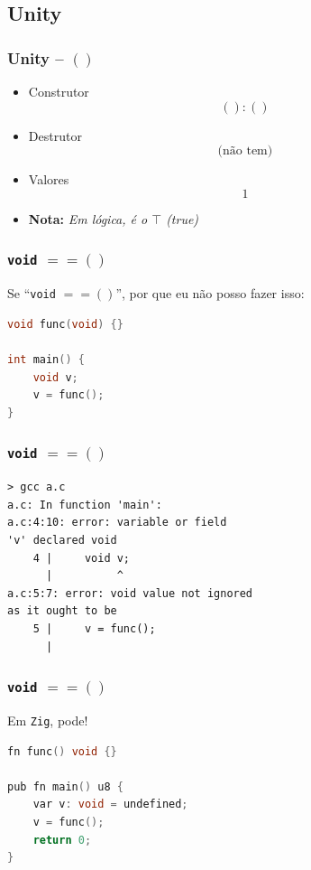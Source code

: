\documentclass{beamer}
\newcommand{\lang}[1]{\texttt{#1}}
\newcommand{\inlcode}[1]{\texttt{#1}}
\newcommand{\nota}[1]{\textbf{Nota:}\textit{ #1}}
\begin{document}
\subsection{Unity}
\begin{frame}
    \frametitle{Unity -- \(()\)}
    \begin{itemize}
        \item Construtor
            \[
                () : ()
            \]
            \vfill
        \item Destrutor
            \[
                \text{(não tem)}
            \]
            \vfill
        \item Valores
            \[
                1
            \]
            \vfill
        \item \nota{Em lógica, é o \(\top\) \emph{(true)}}
    \end{itemize}
\end{frame}

\begin{frame}[fragile]
    \frametitle{\inlcode{void} \(== ()\)}
    Se ``\inlcode{void} \(== ()\)'',
    por que eu não posso fazer isso:
    \vfill
    \begin{lstlisting}[language=C]
void func(void) {}

int main() {
    void v;
    v = func();
}
    \end{lstlisting}
\end{frame}

\begin{frame}[fragile]
    \frametitle{\inlcode{void} \(== ()\)}
    \begin{lstlisting}
> gcc a.c
a.c: In function 'main':
a.c:4:10: error: variable or field
'v' declared void
    4 |     void v;
      |          ^
a.c:5:7: error: void value not ignored
as it ought to be
    5 |     v = func();
      |
    \end{lstlisting}
\end{frame}

\begin{frame}[fragile]
    \frametitle{\inlcode{void} \(== ()\)}
    Em \lang{Zig}, pode!
    \vfill
    \begin{lstlisting}[language=C]
fn func() void {}

pub fn main() u8 {
    var v: void = undefined;
    v = func();
    return 0;
}
    \end{lstlisting}
\end{frame}
\end{document}
